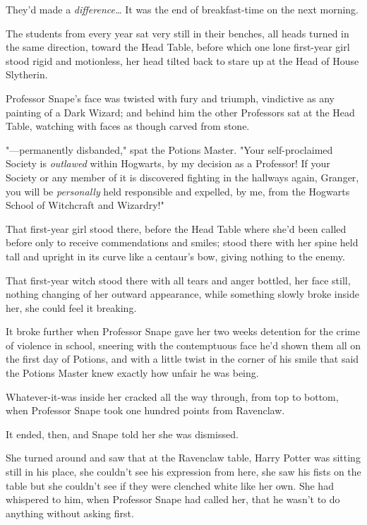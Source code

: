 They'd made a \emph{difference{\ldots}}
\sbreak
It was the end of breakfast-time on the next morning.

The students from every year sat very still in their benches, all heads turned
in the same direction, toward the Head Table, before which one lone first-year
girl stood rigid and motionless, her head tilted back to stare up at the Head
of House Slytherin.

Professor Snape's face was twisted with fury and triumph, vindictive as any
painting of a Dark Wizard; and behind him the other Professors sat at the Head
Table, watching with faces as though carved from stone.

"---permanently disbanded," spat the Potions Master. "Your self-proclaimed
Society is \emph{outlawed} within Hogwarts, by my decision as a Professor! If
your Society or any member of it is discovered fighting in the hallways again,
Granger, you will be \emph{personally} held responsible and expelled, by me,
from the Hogwarts School of Witchcraft and Wizardry!"

That first-year girl stood there, before the Head Table where she'd been called
before only to receive commendations and smiles; stood there with her spine
held tall and upright in its curve like a centaur's bow, giving nothing to the
enemy.

That first-year witch stood there with all tears and anger bottled, her face
still, nothing changing of her outward appearance, while something slowly broke
inside her, she could feel it breaking.

It broke further when Professor Snape gave her two weeks detention for the
crime of violence in school, sneering with the contemptuous face he'd shown
them all on the first day of Potions, and with a little twist in the corner of
his smile that said the Potions Master knew exactly how unfair he was being.

Whatever-it-was inside her cracked all the way through, from top to bottom,
when Professor Snape took one hundred points from Ravenclaw.

It ended, then, and Snape told her she was dismissed.

She turned around and saw that at the Ravenclaw table, Harry Potter was sitting
still in his place, she couldn't see his expression from here, she saw his
fists on the table but she couldn't see if they were clenched white like her
own. She had whispered to him, when Professor Snape had called her, that he
wasn't to do anything without asking first.

